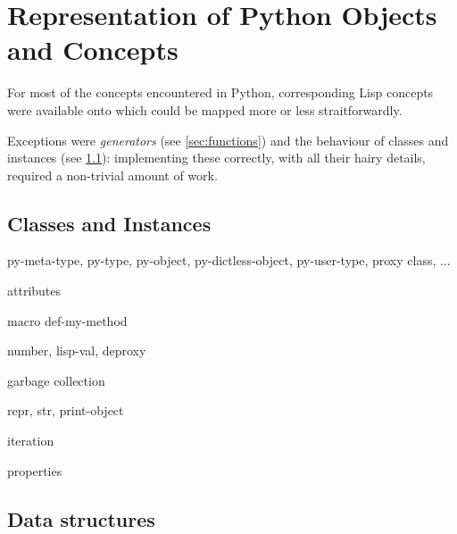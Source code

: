 \documentclass{article}
\begin{document}
\section{Representation of Python Objects and Concepts}
For most of the concepts encountered in Python, corresponding Lisp
concepts were available onto which could be mapped more or less
straitforwardly.

Exceptions were {\em generators} (see \ref{sec:functions}) and the
behaviour of classes and instances (see \ref{sec:classes_instances}):
implementing these correctly, with all their hairy details, required a
non-trivial amount of work.

\subsection{Classes and Instances} \label{sec:classes_instances}
py-meta-type, py-type, py-object, py-dictless-object, py-user-type, proxy class, ...

attributes

macro def-my-method

number, lisp-val, deproxy

garbage collection

repr, str, print-object

iteration

properties

\subsection{Data structures}
\end{document}
